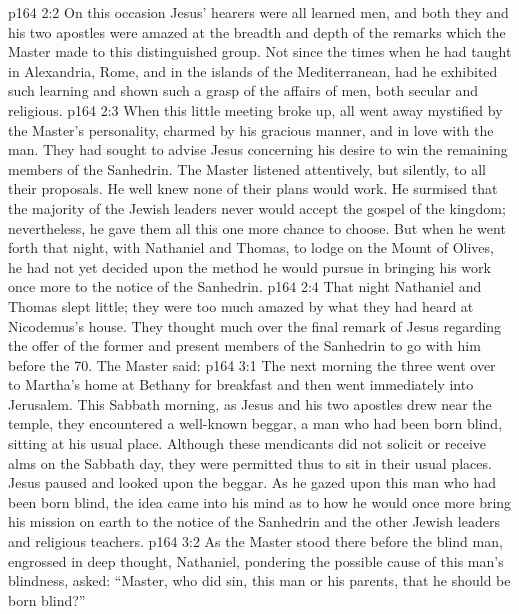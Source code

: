 \vs p164 2:2 On this occasion Jesus’ hearers were all learned men, and both they and his two apostles were amazed at the breadth and depth of the remarks which the Master made to this distinguished group. Not since the times when he had taught in Alexandria, Rome, and in the islands of the Mediterranean, had he exhibited such learning and shown such a grasp of the affairs of men, both secular and religious.
\vs p164 2:3 When this little meeting broke up, all went away mystified by the Master’s personality, charmed by his gracious manner, and in love with the man. They had sought to advise Jesus concerning his desire to win the remaining members of the Sanhedrin. The Master listened attentively, but silently, to all their proposals. He well knew none of their plans would work. He surmised that the majority of the Jewish leaders never would accept the gospel of the kingdom; nevertheless, he gave them all this one more chance to choose. But when he went forth that night, with Nathaniel and Thomas, to lodge on the Mount of Olives, he had not yet decided upon the method he would pursue in bringing his work once more to the notice of the Sanhedrin.
\vs p164 2:4 That night Nathaniel and Thomas slept little; they were too much amazed by what they had heard at Nicodemus’s house. They thought much over the final remark of Jesus regarding the offer of the former and present members of the Sanhedrin to go with him before the 70. The Master said: 
\vs p164 3:1 The next morning the three went over to Martha’s home at Bethany for breakfast and then went immediately into Jerusalem. This Sabbath morning, as Jesus and his two apostles drew near the temple, they encountered a well\hyp{}known beggar, a man who had been born blind, sitting at his usual place. Although these mendicants did not solicit or receive alms on the Sabbath day, they were permitted thus to sit in their usual places. Jesus paused and looked upon the beggar. As he gazed upon this man who had been born blind, the idea came into his mind as to how he would once more bring his mission on earth to the notice of the Sanhedrin and the other Jewish leaders and religious teachers.
\vs p164 3:2 As the Master stood there before the blind man, engrossed in deep thought, Nathaniel, pondering the possible cause of this man’s blindness, asked: “Master, who did sin, this man or his parents, that he should be born blind?”
